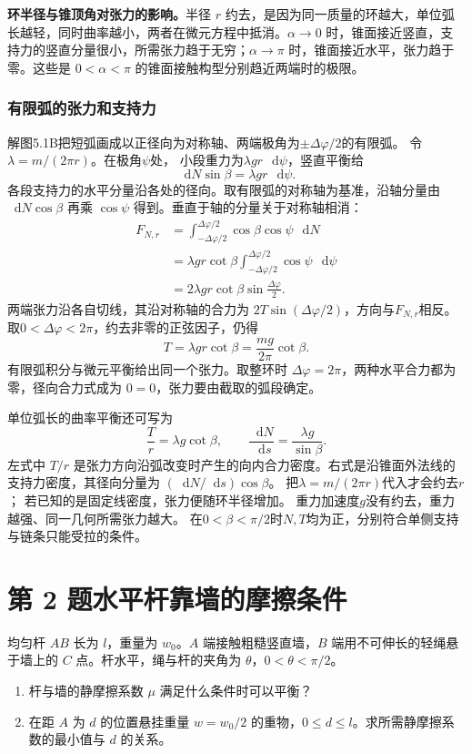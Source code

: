 \documentclass[UTF8,fontset=fandol,a4paper,11pt]{ctexart}
\newcommand{\dd}{\mathop{}\!\mathrm{d}}
\newcommand{\tagline}[1]{\noindent{\small\color{muted}#1}\par}
\begin{document}
\textbf{环半径与锥顶角对张力的影响。}半径 $r$ 约去，是因为同一质量的环越大，单位弧长越轻，同时曲率越小，两者在微元方程中抵消。$\alpha\to0$ 时，锥面接近竖直，支持力的竖直分量很小，所需张力趋于无穷；$\alpha\to\pi$ 时，锥面接近水平，张力趋于零。这些是 $0<\alpha<\pi$ 的锥面接触构型分别趋近两端时的极限。
\subsubsection*{有限弧的张力和支持力}
解图5.1B把短弧画成以正径向为对称轴、两端极角为$\pm\Delta\varphi/2$的有限弧。
令$\lambda=m/(2\pi r)$。在极角$\psi$处，
小段重力为$\lambda gr\,\dd\psi$，竖直平衡给
\[
\dd N\sin\beta=\lambda gr\,\dd\psi.
\]
各段支持力的水平分量沿各处的径向。取有限弧的对称轴为基准，沿轴分量由 $\dd N\cos\beta$ 再乘 $\cos\psi$ 得到。垂直于轴的分量关于对称轴相消：
\[
\begin{aligned}
F_{N,r}
&=\int_{-\Delta\varphi/2}^{\Delta\varphi/2}
\cos\beta\cos\psi\,\dd N\\
&=\lambda gr\cot\beta
\int_{-\Delta\varphi/2}^{\Delta\varphi/2}\cos\psi\,\dd\psi\\
&=2\lambda gr\cot\beta\sin\frac{\Delta\varphi}2.
\end{aligned}
\]
两端张力沿各自切线，其沿对称轴的合力为
$2T\sin(\Delta\varphi/2)$，方向与$F_{N,r}$相反。
取$0<\Delta\varphi<2\pi$，约去非零的正弦因子，仍得
\[
T=\lambda gr\cot\beta=\frac{mg}{2\pi}\cot\beta.
\]
有限弧积分与微元平衡给出同一个张力。取整环时 $\Delta\varphi=2\pi$，两种水平合力都为零，径向合力式成为 $0=0$，张力要由截取的弧段确定。

单位弧长的曲率平衡还可写为
\[
\frac Tr=\lambda g\cot\beta,\qquad
\frac{\dd N}{\dd s}=\frac{\lambda g}{\sin\beta}.
\]
左式中 $T/r$ 是张力方向沿弧改变时产生的向内合力密度。右式是沿锥面外法线的支持力密度，其径向分量为 $(\dd N/\dd s)\cos\beta$。
把$\lambda=m/(2\pi r)$代入才会约去$r$；
若已知的是固定线密度，张力便随环半径增加。
重力加速度$g$没有约去，重力越强、同一几何所需张力越大。
在$0<\beta<\pi/2$时$N,T$均为正，分别符合单侧支持与链条只能受拉的条件。




\section*{第 2 题\quad 水平杆靠墙的摩擦条件}

\tagline{M-05-02}

均匀杆 $AB$ 长为 $l$，重量为 $w_0$。$A$ 端接触粗糙竖直墙，$B$ 端用不可伸长的轻绳悬于墙上的 $C$ 点。杆水平，绳与杆的夹角为 $\theta$，$0<\theta<\pi/2$。
\begin{enumerate}\item 杆与墙的静摩擦系数 $\mu$ 满足什么条件时可以平衡？\item 在距 $A$ 为 $d$ 的位置悬挂重量 $w=w_0/2$ 的重物，$0\le d\le l$。求所需静摩擦系数的最小值与 $d$ 的关系。\end{enumerate}
\end{document}
